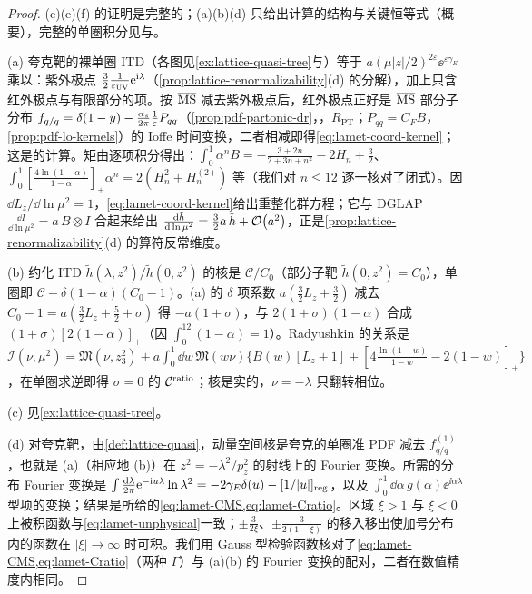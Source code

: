 \begin{proof}
(c)(e)(f) 的证明是完整的；(a)(b)(d) 只给出计算的结构与关键恒等式（概要），完整的单圈积分见\cite[第~III~节与附录~B]{IzubuchiEtAl2018}与\cite{Radyushkin:2018cvn}。

(a) 夸克靶的裸单圈 ITD（各图见\cref{ex:lattice-quasi-tree}与\cite[第~III~节]{IzubuchiEtAl2018}）等于 $a(\mu|z|/2)^{2\varepsilon}\ee^{\varepsilon\gamma_E}$ 乘以：紫外极点 $\frac32\frac1{\varepsilon_{\rm UV}}\mathrm{e}^{\mathrm{i}\lambda}$（\cref{prop:lattice-renormalizability}(d) 的分解），加上只含红外极点与有限部分的项。按 $\overline{\mathrm{MS}}$ 减去紫外极点后，红外极点正好是 $\overline{\mathrm{MS}}$ 部分子分布 $f_{q/q}=\delta(1-y)-\frac{\alpha_s}{2\pi}\frac1{\varepsilon}P_{qq}$（\cref{prop:pdf-partonic-dr}，\tagR，$R_{\mathrm{PT}}$；$P_{qq}=C_F B$，\cref{prop:pdf-lo-kernels}）的 Ioffe 时间变换，二者相减即得\cref{eq:lamet-coord-kernel}；这是\cite{IzubuchiEtAl2018,Radyushkin:2018cvn,Zhang:2018ggy}的计算。矩由逐项积分得出：$\int_0^1\alpha^nB=-\frac{3+2n}{2+3n+n^2}-2H_n+\frac32$、$\int_0^1[\frac{4\ln(1-\alpha)}{1-\alpha}]_+\alpha^n=2(H_n^2+H_n^{(2)})$ 等（我们对 $n\le12$ 逐一核对了闭式）。因 $\dd L_z/\dd\ln\mu^2=1$，\cref{eq:lamet-coord-kernel}给出重整化群方程；它与 DGLAP $\frac{\dd I}{\dd\ln\mu^2}=a\,B\otimes I$ 合起来给出 $\frac{\mathrm{d}\tilde h}{\mathrm{d}\ln\mu^2}=\frac32a\,\tilde h+\mathcal{O}\!\left(a^2\right)$，正是\cref{prop:lattice-renormalizability}(d) 的算符反常维度。

(b) 约化 ITD $\tilde h(\lambda,z^2)/\tilde h(0,z^2)$ 的核是 $\mathcal C/C_0$（部分子靶 $\tilde h(0,z^2)=C_0$），单圈即 $\mathcal C-\delta(1-\alpha)(C_0-1)$。(a) 的 $\delta$ 项系数 $a(\frac32L_z+\frac32)$ 减去 $C_0-1=a(\frac32L_z+\frac52+\sigma)$ 得 $-a(1+\sigma)$，与 $2(1+\sigma)(1-\alpha)$ 合成 $(1+\sigma)[2(1-\alpha)]_+$（因 $\int_0^12(1-\alpha)=1$）。Radyushkin 的关系\cite{Radyushkin:2018cvn}是 $\mathcal I(\nu,\mu^2)=\mathfrak M(\nu,z_3^2)+a\int_0^1\dd w\,\mathfrak M(w\nu)\{B(w)[L_z+1]+[4\frac{\ln(1-w)}{1-w}-2(1-w)]_+\}$，在单圈求逆即得 $\sigma=0$ 的 $\mathcal C^{\rm ratio}$；核是实的，$\nu=-\lambda$ 只翻转相位。

(c) 见\cref{ex:lattice-quasi-tree}。

(d) 对夸克靶，由\cref{def:lattice-quasi}，动量空间核是夸克的单圈准 PDF 减去 $f^{(1)}_{q/q}$，也就是 (a)（相应地 (b)）在 $z^2=-\lambda^2/p_z^2$ 的射线上的 Fourier 变换。所需的分布 Fourier 变换是 $\int\frac{\mathrm{d}\lambda}{2\pi}\mathrm{e}^{-\mathrm{i} u\lambda}\ln\lambda^2=-2\gamma_E\delta(u)-[1/|u|]_{\rm reg}$，以及 $\int_0^1\dd\alpha\,g(\alpha)\ee^{\ii\alpha\lambda}$ 型项的变换；结果是\cite[第~III~节]{IzubuchiEtAl2018}所给的\cref{eq:lamet-CMS,eq:lamet-Cratio}。区域 $\xi>1$ 与 $\xi<0$ 上被积函数与\cref{eq:lamet-unphysical}一致；$\pm\frac3{2\xi}$、$\pm\frac3{2(1-\xi)}$ 的移入移出使加号分布内的函数在 $|\xi|\to\infty$ 时可积。我们用 Gauss 型检验函数核对了\cref{eq:lamet-CMS,eq:lamet-Cratio}（两种 $\Gamma$）与 (a)(b) 的 Fourier 变换的配对，二者在数值精度内相同。


\end{proof}
